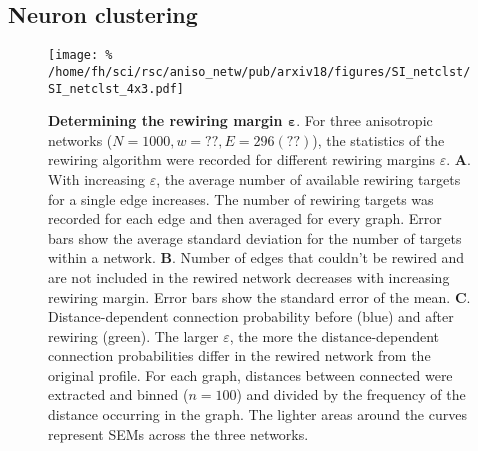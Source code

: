\clearpage
\pagebreak
\newpage
\subsection{Neuron clustering}

\addtocounter{subsection}{1}
\begin{figure}[h!]
  \texttt{[image: \%
    /home/fh/sci/rsc/aniso\_netw/pub/arxiv18/figures/SI\_netclst/SI\_netclst\_4x3.pdf]}
  \caption{\textbf{Determining the rewiring margin $\bm{\varepsilon}$}. For three anisotropic networks ($N=1000, w=??, E= 296 (??)$), the statistics of the rewiring algorithm were recorded for different rewiring margins $\varepsilon$.
    \textbf{A}. With increasing $\varepsilon$, the average number of available rewiring targets for a single edge increases. The number of rewiring targets was recorded for each edge and then averaged for every graph. Error bars show the average standard deviation for the number of targets within a network.
    \textbf{B}. Number of edges that couldn't be rewired and are not included in the rewired network decreases with increasing rewiring margin. Error bars show the standard error of the mean. \textbf{C}. Distance-dependent connection probability before (blue) and after rewiring (green). The larger $\varepsilon$, the more the distance-dependent connection probabilities differ in the rewired network from the original profile. For each graph, distances between connected were extracted and binned ($n=100$) and divided by the frequency of the distance occurring in the graph. The lighter areas around the curves represent SEMs across the three networks.}
  \label{fig:nclst}
\end{figure}
